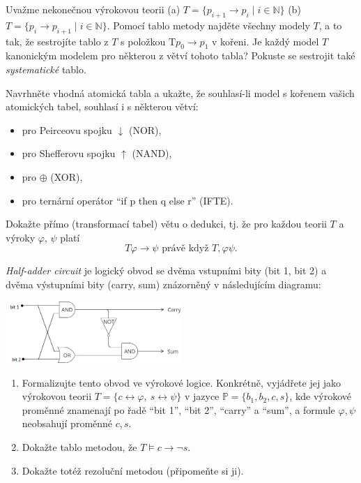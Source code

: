 \documentclass[a4paper,12pt]{article}
\begin{document}
\medskip\begin{problem}
    Uvažme nekonečnou výrokovou teorii (a) $T=\{p_{i+1} \to p_i\mid i\in \mathbb{N}\}$ (b) $T=\{p_i \to p_{i+1}\mid i\in \mathbb{N}\}$. Pomocí tablo metody najděte všechny modely $T$, a to tak, že sestrojíte tablo z $T$ s položkou $\mathrm{T}p_0\to p_1$ v kořeni. Je každý model $T$ kanonickým modelem pro některou z větví tohoto tabla? Pokuste se sestrojit také \emph{systematické} tablo.
\end{problem}




\medskip\begin{problem} 
    Navrhněte vhodná atomická tabla a ukažte, že souhlasí-li model s kořenem vašich atomických tabel, souhlasí i s některou větví:
    \begin{itemize}
        \item pro Peirceovu spojku $\downarrow$ (NOR),
        \item pro Shefferovu spojku $\uparrow$ (NAND),
        \item pro $\oplus$ (XOR),
        \item pro ternární operátor ``if p then q else r'' (IFTE).
    \end{itemize}  
    
\end{problem}


\medskip\begin{problem}
    Dokažte přímo (transformací tabel) větu o dedukci, tj. že pro každou teorii $T$ a výroky $\varphi$, $\psi$ platí
    $$T  \varphi\to \psi\text{\ \ právě když\ \ }T,\varphi  \psi.$$
    \end{problem}


\medskip\begin{problem}
    \emph{Half-adder circuit} je logický obvod se dvěma vstupními bity (bit 1, bit 2) a dvěma výstupními bity (carry, sum) znázorněný v následujícím diagramu:
    \begin{center}
        \includegraphics[width=0.5\textwidth]{files/half-adder.png}
    \end{center}
    \begin{enumerate}
            \item Formalizujte tento obvod ve výrokové logice. Konkrétně, vyjádřete jej jako výrokovou teorii $T=\{c\leftrightarrow \varphi,\ s\leftrightarrow \psi\}$ v jazyce $\mathbb P=\{b_1,b_2,c,s\}$, kde výrokové proměnné znamenají po řadě ``bit 1'', ``bit 2'', ``carry'' a ``sum'', a formule $\varphi,\psi$ neobsahují proměnné $c,s$.
            \item Dokažte tablo metodou, že $T\models c\to\neg s$.
            \item Dokažte totéž rezoluční metodou (připomeňte si ji).
    \end{enumerate}
    \end{problem}
\end{document}
